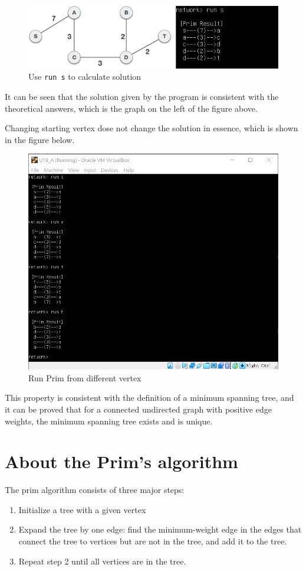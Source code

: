 \documentclass[cn,black,12pt,normal]{elegantnote}
\begin{document}
\begin{figure}[H]
    \centering
    \includegraphics[width=1.0\linewidth]{image/tree.png}
    \caption{Use \lstinline{run s} to calculate solution}
\end{figure}
It can be seen that the solution given by the program is consistent with the theoretical answers, which is the graph on the left of the figure above.

Changing starting vertex dose not change the solution in essence, which is shown in the figure below.

\begin{figure}[H]
    \centering
    \includegraphics[width=0.7\linewidth]{image/grid_03.jpg}
    \caption{Run Prim from different vertex}
\end{figure}

This property is consistent with the definition of a minimum spanning tree, and it can be proved that for a connected undirected graph with positive edge weights, the minimum spanning tree exists and is unique.

\section{About the Prim's algorithm}

The prim algorithm consists of three major steps:
\begin{enumerate}
    \item Initialize a tree with a given vertex
    \item Expand the tree by one edge: find the minimum-weight edge in the edges that connect the tree to vertices but are not in the tree, and add it to the tree.
    \item Repeat step 2 until all vertices are in the tree.
\end{enumerate}
\end{document}
